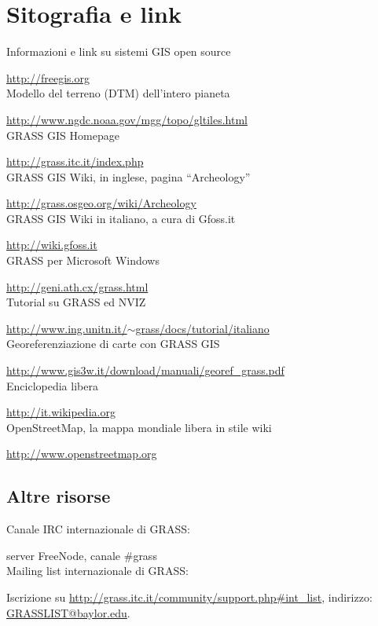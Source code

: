 \chapter*{Sitografia e link}

Informazioni e link su sistemi GIS open source

\href{http://freegis.org}{http://freegis.org}\\
Modello del terreno (DTM) dell'intero pianeta

\href{http://www.ngdc.noaa.gov/mgg/topo/gltiles.html}{http://www.ngdc.noaa.gov/mgg/topo/gltiles.html}\\
GRASS GIS Homepage

\href{http://grass.itc.it/index.php}{http://grass.itc.it/index.php}\\
GRASS GIS Wiki, in inglese, pagina {}``Archeology''

\href{http://grass.osgeo.org/wiki/Archeology}{http://grass.osgeo.org/wiki/Archeology}\\
GRASS GIS Wiki in italiano, a cura di Gfoss.it

\href{http://wiki.gfoss.it}{http://wiki.gfoss.it}\\
GRASS per Microsoft Windows

\href{http://geni.ath.cx/grass.html}{http://geni.ath.cx/grass.html}\\
Tutorial su GRASS ed NVIZ

\href{http://www.ing.unitn.it/~grass/docs/tutorial/italiano}{http://www.ing.unitn.it/$\sim$grass/docs/tutorial/italiano}\\
Georeferenziazione di carte con GRASS GIS

\href{http://www.gis3w.it/download/manuali/georef_grass.pdf}{http://www.gis3w.it/download/manuali/georef\_{}grass.pdf}\\
Enciclopedia libera

\href{http://it.wikipedia.org}{http://it.wikipedia.org}\\
OpenStreetMap, la mappa mondiale libera in stile wiki

\href{http://www.openstreetmap.org}{http://www.openstreetmap.org}\\



\section*{Altre risorse}

Canale IRC internazionale di GRASS:

server \textsf{FreeNode}, canale \#grass\\
Mailing list internazionale di GRASS:

Iscrizione su \href{http://grass.itc.it/community/support.php\#int_list}{http://grass.itc.it/community/support.php\#{}int\_{}list},
indirizzo: \href{mailto:GRASSLIST@baylor.edu}{GRASSLIST@baylor.edu}.
